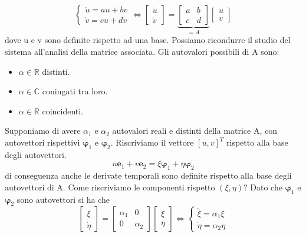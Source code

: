 \begin{equation}
	\left \{ \begin{array}{l}
		\dot{u} = au+bv\\
		\dot{v} = cu+dv
	\end{array} \right.
	\iff 
	\left [\begin{array}{c}
		\dot{u} \\
		\dot{v}
	\end{array} \right] =
	\underbrace{\left [ \begin{array}{cc}
		a & b \\
		c & d
	\end{array} \right]}_{ = A}
	\left [\begin{array}{c}
		u \\
		v
	\end{array} \right]
\end{equation}
\newline
dove u e v sono definite rispetto ad una base. Possiamo ricondurre il studio del sistema all'analisi della matrice associata. Gli autovalori possibili di A sono:
\begin{itemize}
	\item $\alpha \in \mathbb{R}$ distinti.
	\item $\alpha \in \mathbb{C}$ coniugati tra loro.
	\item $\alpha \in \mathbb{R}$ coincidenti.
\end{itemize} 
Supponiamo di avere $\alpha_1$ e $\alpha_2$ autovalori reali e distinti della matrice A, con autovettori rispettivi $\bm{\varphi}_1$ e $\bm{\varphi}_2$. Riscriviamo il vettore $[u,v]^T$ rispetto alla base degli autovettori.
\begin{equation*}
	u \bm{e}_1 + v \bm{e}_2 = \xi \bm{\varphi}_1 + \eta \bm{\varphi}_2
\end{equation*}
di conseguenza anche le derivate temporali sono definite rispetto alla base degli autovettori di A. Come riscriviamo le componenti rispetto $(\xi,\eta) ?$
\newline
Dato che $\bm{\varphi}_1$ e $\bm{\varphi}_2$ sono autovettori si ha che 
\begin{equation*}
		\left [\begin{array}{c}
		\dot{\xi} \\
		\dot{\eta}
	\end{array} \right] =
	\left [ \begin{array}{cc}
		\alpha_1 & 0 \\
		0 & \alpha_2
	\end{array} \right]
	\left [\begin{array}{c}
		\xi \\
		\eta
	\end{array} \right]
	\iff 	\left \{ \begin{array}{l}
		\dot{\xi} = \alpha_1 \xi\\
		\dot{\eta} = \alpha_2 \eta 
	\end{array} \right.
\end{equation*}
